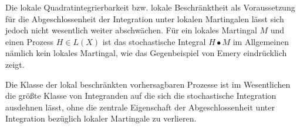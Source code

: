 Die lokale Quadratintegrierbarkeit bzw. lokale Beschränktheit als Voraussetzung
für die Abgeschlossenheit der Integration unter lokalen Martingalen lässt sich
jedoch nicht wesentlich weiter abschwächen. Für ein lokales Martingal $M$ und
einen Prozess $H\in L(X)$ ist das stochastische Integral $H \bullet M$ im
Allgemeinen nämlich kein lokales Martingal, wie das Gegenbeispiel von Emery
eindrücklich zeigt.

Die Klasse der lokal beschränkten vorhersagbaren Prozesse ist im Wesentlichen
die größte Klasse von Integranden auf die sich die stochastische Integration
ausdehnen lässt, ohne die zentrale Eigenschaft der Abgeschlossenheit unter
Integration bezüglich lokaler Martingale zu verlieren.